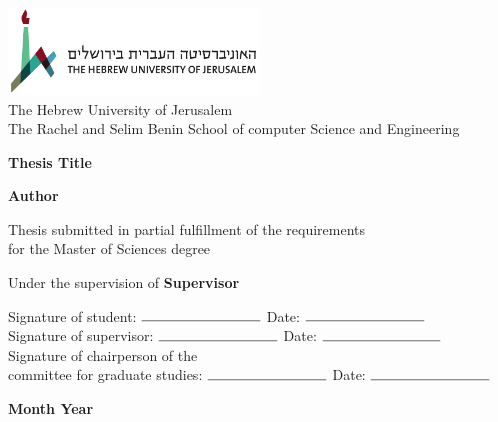 \begin{titlepage}
    \begin{center}
        \vspace*{1cm}
        
        \includegraphics[width=0.5\textwidth]{huji_logo_hor.pdf}\\
        The Hebrew University of Jerusalem\\
        The Rachel and Selim Benin School of computer Science and Engineering
        
        \vspace{2cm}
        
        {\Large \textbf{Thesis Title}}
        
        \vspace{1.5cm}
        
        \textbf{Author}
        
        \vspace{1cm}
        
        Thesis submitted in partial fulfillment of the requirements\\for the Master of Sciences degree
        
        \vspace{1cm}
        
        Under the supervision of \textbf{Supervisor}
        
        \vspace{1cm}
        
        \begin{flushleft}
        Signature of student: \( \rule{3cm}{0.15mm} \) \hfill Date: \( \rule{3cm}{0.15mm} \)\\
        Signature of supervisor: \( \rule{3cm}{0.15mm} \) \hfill Date: \( \rule{3cm}{0.15mm} \)\\
        Signature of chairperson of the\\committee for graduate studies: \( \rule{3cm}{0.15mm} \) \hfill Date: \( \rule{3cm}{0.15mm} \)
        \end{flushleft}
        
        \vfill
        
        \textbf{Month Year}
    \end{center}
\end{titlepage}